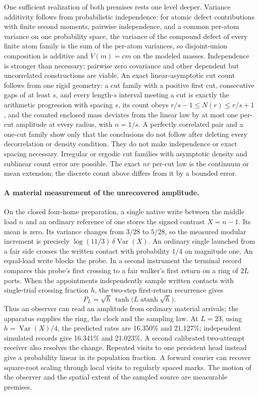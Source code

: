 \documentclass[11pt]{article}
\begin{document}
One sufficient realization of both premises rests one level deeper. Variance
additivity follows from probabilistic independence: for atomic defect
contributions with finite second moments, pairwise independence, and a
common per-atom variance on one probability space, the variance of the
compound defect of every finite atom family is the sum of the per-atom
variances, so disjoint-union composition is additive and \(V(m)=cm\) on
the modeled masses. Independence is stronger than necessary; pairwise zero
covariance and other dependent but uncorrelated constructions are viable.
An exact linear-asymptotic cut count follows from one rigid geometry: a
cut family with a positive first cut, consecutive gaps of at least \(s\),
and every length-\(s\) interval meeting a cut is exactly the arithmetic
progression with spacing \(s\), its count obeys
\(r/s-1\le N(r)\le r/s+1\), and the counted enclosed mass deviates from
the linear law by at most one per-cut amplitude at every radius, with
\(n=1/s\). A perfectly correlated pair and a one-cut family show only that
the conclusions do not follow after deleting every decorrelation or density
condition. They do not make independence or exact spacing necessary.
Irregular or ergodic cut families with asymptotic density and sublinear count
error are possible. The exact \(nr\) per-cut law is the continuum or
mean extension; the discrete count above differs from it by a bounded error.

\paragraph{A material measurement of the unrecovered amplitude.}
On the closed four-home preparation, a single native write between
the middle load \(n\) and an ordinary reference of one stores the
signed contrast \(X=n-1\). Its mean is zero. Its variance changes from
\(3/28\) to \(5/28\), so the measured modular increment is precisely
\(\log(11/3)\,\delta\operatorname{Var}(X)\). An ordinary single launched
from a fair side crosses the written contact with probability \(1/4\)
on magnitude one. An equal-load write blocks the probe. In a second
instrument the terminal record compares this probe's first crossing
to a fair walker's first return on a ring of \(2L\) ports. When the
appointments independently sample written contacts with single-trial
crossing fraction \(h\), the two-step first-return recurrence gives
\[
 P_L=\sqrt h\,\tanh\!\big(L\operatorname{atanh}\sqrt h\big).
\]
Thus an observer can read an amplitude from ordinary material arrivals;
the apparatus supplies the ring, the clock and the sampling law. At
\(L=23\), using \(h=\operatorname{Var}(X)/4\), the predicted rates
are 16.350\% and 21.127\%; independent simulated records give
16.341\% and 21.023\%. A second calibrated two-attempt receiver also
resolves the change. Repeated visits to one persistent head instead
give a probability linear in its population fraction. A forward
courier can recover square-root scaling through local visits to
regularly spaced marks. The motion of the observer and the spatial
extent of the sampled source are measurable premises.
\end{document}
